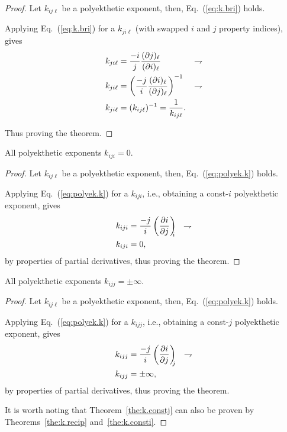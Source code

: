     \begin{proof}
        Let $k_{ij\ell}$ be a polyekthetic exponent, then, Eq.~(\ref{eq:k.bri}) holds.

        Applying Eq.~(\ref{eq:k.bri}) for a $k_{ji\ell}$ (with swapped $i$ and $j$ property
        indices), gives
        \begin{align}
            k_{ji\ell} & = \frac{-i}{j}\frac{(\partial {{j}})_{{\ell}}}{(\partial {{i}})_{{\ell}}} 
                       & \rightharpoondown\\
            k_{ji\ell} & = \left(\frac{-j}{i}\frac{(\partial {{i}})_{{\ell}}}{(\partial {{j}})_{{\ell}}}\right)^{-1}
                       & \rightharpoondown\\
            k_{ji\ell} & = (k_{ij\ell})^{-1} = \frac{1}{k_{ij\ell}}.
        \end{align}

        Thus proving the theorem.
    \end{proof}

    \begin{theorem}\label{the:k.consti}
        All polyekthetic exponents $k_{iji} = 0$.
    \end{theorem}

    \begin{proof}
        Let $k_{ij\ell}$ be a polyekthetic exponent, then, Eq.~(\ref{eq:polyek.k}) holds.

        Applying  Eq.~(\ref{eq:polyek.k})  for  a  $k_{iji}$,  i.e.,   obtaining   a   const-$i$
        polyekthetic exponent, gives
        \begin{align}
            k_{iji} &= \frac{-j}{i} \left(\frac{\partial {{i}}}{\partial {{j}}}\right)_{\!\!\!{i}}
                    & \rightharpoondown\\
            k_{iji} &= 0,
        \end{align}
        \noindent by properties of partial derivatives, thus proving the theorem.
    \end{proof}

    \begin{theorem}\label{the:k.constj}
        All polyekthetic exponents $k_{ijj} = \pm\infty$.
    \end{theorem}

    \begin{proof}
        Let $k_{ij\ell}$ be a polyekthetic exponent, then, Eq.~(\ref{eq:polyek.k}) holds.

        Applying  Eq.~(\ref{eq:polyek.k})  for  a  $k_{ijj}$,  i.e.,   obtaining   a   const-$j$
        polyekthetic exponent, gives
        \begin{align}
            k_{ijj} &= \frac{-j}{i} \left(\frac{\partial {{i}}}{\partial {{j}}}\right)_{\!\!\!{j}}
                    & \rightharpoondown\\
            k_{ijj} &= \pm\infty,
        \end{align}
        \noindent by properties of partial derivatives, thus proving the theorem.

        It  is  worth  noting  that   Theorem~\ref{the:k.constj}   can   also   be   proven   by
        Theorems~\ref{the:k.recip} and~\ref{the:k.consti}.
    \end{proof}

